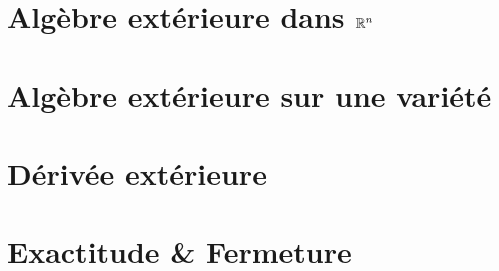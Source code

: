 \chapter{Algèbre extérieure dans \( \mathbb{R}^n \)}
\chapter{Algèbre extérieure sur une variété}
\chapter{Dérivée extérieure}
\chapter{Exactitude \& Fermeture}
